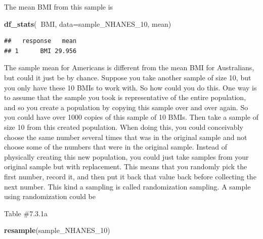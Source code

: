 \documentclass[
]{book}
\newenvironment{Shaded}{\begin{snugshade}}{\end{snugshade}}
\newcommand{\DataTypeTok}[1]{\textcolor[rgb]{0.13,0.29,0.53}{#1}}
\newcommand{\DecValTok}[1]{\textcolor[rgb]{0.00,0.00,0.81}{#1}}
\newcommand{\KeywordTok}[1]{\textcolor[rgb]{0.13,0.29,0.53}{\textbf{#1}}}
\newcommand{\NormalTok}[1]{#1}
\newcommand{\OperatorTok}[1]{\textcolor[rgb]{0.81,0.36,0.00}{\textbf{#1}}}
\begin{document}
The mean BMI from this sample is

\begin{Shaded}
\begin{Highlighting}[]
\KeywordTok{df_stats}\NormalTok{(}\OperatorTok{~}\NormalTok{BMI, }\DataTypeTok{data=}\NormalTok{sample_NHANES_}\DecValTok{10}\NormalTok{, mean)}
\end{Highlighting}
\end{Shaded}

\begin{verbatim}
##   response   mean
## 1      BMI 29.956
\end{verbatim}

The sample mean for Americans is different from the mean BMI for Australians, but could it just be by chance. Suppose you take another sample of size 10, but you only have these 10 BMIs to work with. So how could you do this. One way is to assume that the sample you took is representative of the entire population, and so you create a population by copying this sample over and over again. So you could have over 1000 copies of this sample of 10 BMIs. Then take a sample of size 10 from this created population. When doing this, you could conceivably choose the same number several times that was in the original sample and not choose some of the numbers that were in the original sample. Instead of physically creating this new population, you could just take samples from your original sample but with replacement. This means that you randomly pick the first number, record it, and then put it back that value back before collecting the next number. This kind a sampling is called randomization sampling. A sample using randomization could be

Table \#7.3.1a

\begin{Shaded}
\begin{Highlighting}[]
\KeywordTok{resample}\NormalTok{(sample_NHANES_}\DecValTok{10}\NormalTok{)}
\end{Highlighting}
\end{Shaded}
\end{document}
